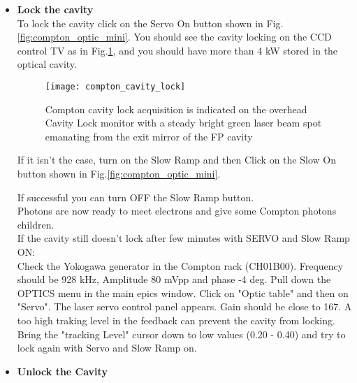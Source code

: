 {\begin{itemize}
\item {\bf Lock the cavity}\\
	
 To lock the cavity click on the Servo On button shown in Fig.\ref{fig:compton_optic_mini}.
You should see the cavity locking
on the CCD control TV as in  Fig.\ref{fig:compton_cavity_lock}, and you should have more than 4 kW stored in the optical cavity.
\begin{figure}[htp]
    \begin{center}
        \texttt{[image: compton\_cavity\_lock]}
    \end{center}
    \caption[compton:cavity lock]{Compton cavity lock acquisition is indicated on the overhead Cavity Lock monitor with a steady bright green laser beam spot emanating from the exit mirror of the FP cavity}
    \label{fig:compton_cavity_lock}
\end{figure}

If it isn't the case, turn on the Slow Ramp and then Click on the Slow On button shown in 
Fig.\ref{fig:compton_optic_mini}.

    If successful you can turn OFF the Slow Ramp button.\\
    Photons are now ready to meet electrons and give some Compton photons children.\\

    If the cavity still doesn't lock after few minutes with SERVO and Slow Ramp ON:\\
Check the Yokogawa generator in the Compton rack (CH01B00).
Frequency should be 928 kHz, Amplitude 80 mVpp and phase -4 deg.
Pull down the OPTICS menu in the main epics window. Click on "Optic table" and then on "Servo".
The laser servo control panel appears.%
Gain should be close to 167. A too high traking level in the feedback can prevent the
cavity from locking. Bring the "tracking Level" cursor down to low values (0.20 - 0.40)
and try to lock again with Servo and Slow Ramp on.

\item {\bf Unlock the Cavity}


\end{itemize}}
